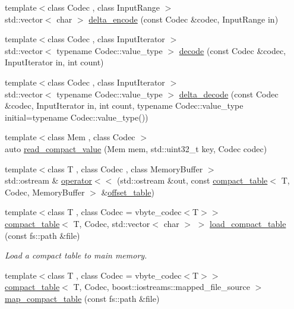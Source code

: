 \begin{DoxyCompactItemize}
\item 
{\footnotesize template$<$class Codec , class Input\+Range $>$ }\\std\+::vector$<$ char $>$ \mbox{\hyperlink{namespaceirk_ab11cd6640f103b27c78573d29c8ff423}{delta\+\_\+encode}} (const Codec \&codec, Input\+Range in)
\item 
{\footnotesize template$<$class Codec , class Input\+Iterator $>$ }\\std\+::vector$<$ typename Codec\+::value\+\_\+type $>$ \mbox{\hyperlink{namespaceirk_ac678e4f1c19b59023c14a6deb7fe801e}{decode}} (const Codec \&codec, Input\+Iterator in, int count)
\item 
{\footnotesize template$<$class Codec , class Input\+Iterator $>$ }\\std\+::vector$<$ typename Codec\+::value\+\_\+type $>$ \mbox{\hyperlink{namespaceirk_aed126d81c1570fca4222c3d51a8f4ba2}{delta\+\_\+decode}} (const Codec \&codec, Input\+Iterator in, int count, typename Codec\+::value\+\_\+type initial=typename Codec\+::value\+\_\+type())
\item 
{\footnotesize template$<$class Mem , class Codec $>$ }\\auto \mbox{\hyperlink{namespaceirk_a98ebfab64f6f91c847caacbac527e9dd}{read\+\_\+compact\+\_\+value}} (Mem mem, std\+::uint32\+\_\+t key, Codec codec)
\item 
{\footnotesize template$<$class T , class Codec , class Memory\+Buffer $>$ }\\std\+::ostream \& \mbox{\hyperlink{namespaceirk_a2bc6394c2673a19ce5bf0ca74641c41d}{operator$<$$<$}} (std\+::ostream \&out, const \mbox{\hyperlink{classirk_1_1compact__table}{compact\+\_\+table}}$<$ T, Codec, Memory\+Buffer $>$ \&\mbox{\hyperlink{namespaceirk_a3d7b00f359d122e0bf0f709d21f00098}{offset\+\_\+table}})
\item 
{\footnotesize template$<$class T , class Codec  = vbyte\+\_\+codec$<$\+T$>$$>$ }\\\mbox{\hyperlink{classirk_1_1compact__table}{compact\+\_\+table}}$<$ T, Codec, std\+::vector$<$ char $>$ $>$ \mbox{\hyperlink{namespaceirk_af5d69d1a8b720ed220cac2ba35bf704f}{load\+\_\+compact\+\_\+table}} (const fs\+::path \&file)
\begin{DoxyCompactList}\small\item\em Load a compact table to main memory. \end{DoxyCompactList}\item 
{\footnotesize template$<$class T , class Codec  = vbyte\+\_\+codec$<$\+T$>$$>$ }\\\mbox{\hyperlink{classirk_1_1compact__table}{compact\+\_\+table}}$<$ T, Codec, boost\+::iostreams\+::mapped\+\_\+file\+\_\+source $>$ \mbox{\hyperlink{namespaceirk_a2404dd8fd003ee848e563f3538972979}{map\+\_\+compact\+\_\+table}} (const fs\+::path \&file)

\end{DoxyCompactItemize}
